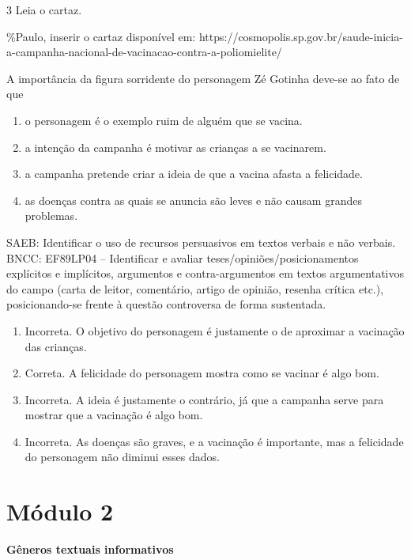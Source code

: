 \num{3} Leia o cartaz.

\%Paulo, inserir o cartaz disponível em:
https://cosmopolis.sp.gov.br/saude-inicia-a-campanha-nacional-de-vacinacao-contra-a-poliomielite/

A importância da figura sorridente do personagem Zé Gotinha deve-se ao
fato de que

\begin{enumerate}
\def\labelenumi{\alph{enumi})}
\tightlist
\item
  o personagem é o exemplo ruim de alguém que se vacina.
\item
  a intenção da campanha é motivar as crianças a se vacinarem.
\item
  a campanha pretende criar a ideia de que a vacina afasta a felicidade.
\item
  as doenças contra as quais se anuncia são leves e não causam grandes
  problemas.
\end{enumerate}

SAEB: Identificar o uso de recursos persuasivos em textos verbais e não
verbais. BNCC: EF89LP04 -- Identificar e avaliar
teses/opiniões/posicionamentos explícitos e implícitos, argumentos e
contra-argumentos em textos argumentativos do campo (carta de leitor,
comentário, artigo de opinião, resenha crítica etc.), posicionando-se
frente à questão controversa de forma sustentada.

\begin{enumerate}
\def\labelenumi{\alph{enumi})}
\tightlist
\item
  Incorreta. O objetivo do personagem é justamente o de aproximar a
  vacinação das crianças.
\item
  Correta. A felicidade do personagem mostra como se vacinar é algo bom.
\item
  Incorreta. A ideia é justamente o contrário, já que a campanha serve
  para mostrar que a vacinação é algo bom.
\item
  Incorreta. As doenças são graves, e a vacinação é importante, mas a
  felicidade do personagem não diminui esses dados.
\end{enumerate}

\hypertarget{muxf3dulo-2}{%
\section{Módulo 2}\label{muxf3dulo-2}}

\textbf{Gêneros textuais informativos}


